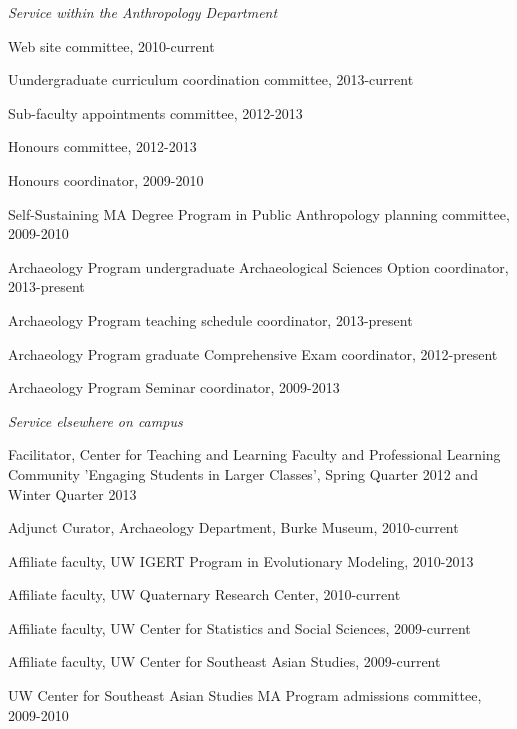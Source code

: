 
\medskip

\noindent\emph{Service within the Anthropology Department \vspace{0.01in}}

\ind Web site committee, 2010-current

\ind Uundergraduate curriculum coordination committee, 2013-current

\ind Sub-faculty appointments committee, 2012-2013

\ind Honours committee, 2012-2013

\ind Honours coordinator, 2009-2010

\ind Self-Sustaining MA Degree Program in Public Anthropology planning committee, 2009-2010

\ind Archaeology Program undergraduate Archaeological Sciences Option coordinator, 2013-present

\ind Archaeology Program teaching schedule coordinator, 2013-present

\ind Archaeology Program graduate Comprehensive Exam coordinator, 2012-present

\ind Archaeology Program Seminar coordinator, 2009-2013

 \medskip

\noindent\emph{Service elsewhere on campus\vspace{0.01in}}

\ind Facilitator, Center for Teaching and Learning Faculty and Professional Learning Community 'Engaging Students in Larger Classes', Spring Quarter 2012 and Winter Quarter 2013

\ind Adjunct Curator, Archaeology Department, Burke Museum, 2010-current

\ind Affiliate faculty, UW IGERT Program in Evolutionary Modeling, 2010-2013

\ind Affiliate faculty, UW Quaternary Research Center, 2010-current

\ind Affiliate faculty, UW Center for Statistics and Social Sciences, 2009-current

\ind Affiliate faculty, UW Center for Southeast Asian Studies, 2009-current

\ind UW Center for Southeast Asian Studies MA Program admissions committee, 2009-2010

